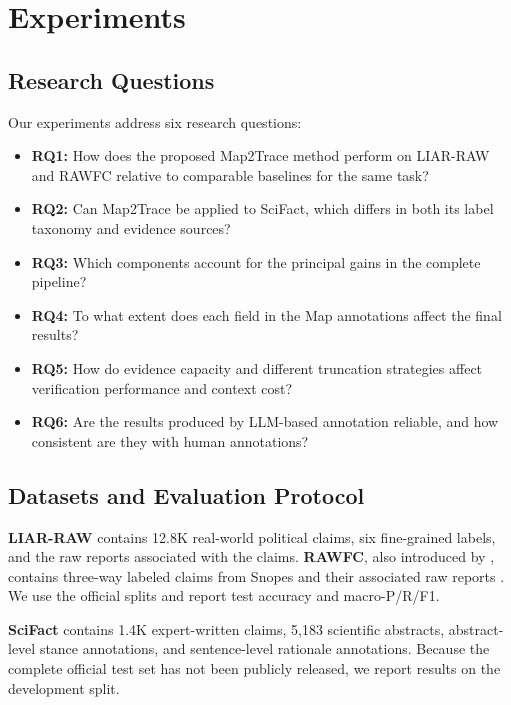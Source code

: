 \documentclass[letterpaper]{article}
\begin{document}
\section{Experiments}

\subsection{Research Questions}

Our experiments address six research questions:

\begin{itemize}
\item \textbf{RQ1:} How does the proposed Map2Trace method perform on LIAR-RAW and RAWFC relative to comparable baselines for the same task?
\item \textbf{RQ2:} Can Map2Trace be applied to SciFact, which differs in both its label taxonomy and evidence sources?
\item \textbf{RQ3:} Which components account for the principal gains in the complete pipeline?
\item \textbf{RQ4:} To what extent does each field in the Map annotations affect the final results?
\item \textbf{RQ5:} How do evidence capacity and different truncation strategies affect verification performance and context cost?
\item \textbf{RQ6:} Are the results produced by LLM-based annotation reliable, and how consistent are they with human annotations?
\end{itemize}

\subsection{Datasets and Evaluation Protocol}

\textbf{LIAR-RAW} \citep{Yang2022CofCED} contains 12.8K real-world political claims, six fine-grained labels, and the raw reports associated with the claims. \textbf{RAWFC}, also introduced by \citep{Yang2022CofCED}, contains three-way labeled claims from Snopes and their associated raw reports \citep{Yang2022CofCED}. We use the official splits and report test accuracy and macro-P/R/F1.

\textbf{SciFact} \citep{Wadden2020SciFact} contains 1.4K expert-written claims, 5,183 scientific abstracts, abstract-level stance annotations, and sentence-level rationale annotations. Because the complete official test set has not been publicly released, we report results on the development split.
\end{document}
